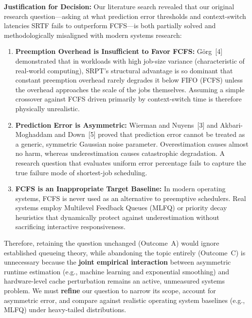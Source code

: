 \documentclass[11pt]{article}
\newcommand{\topicTitle}[1]{
    \vspace{1.2em}\noindent{\fontsize{14}{16.8}\selectfont \textbf{#1}}\par\vspace{0.5em}
}
\begin{document}
\noindent\textbf{Justification for Decision:}
Our literature search revealed that our original research question—asking at what prediction error thresholds and context-switch latencies SRTF fails to outperform FCFS—is both partially solved and methodologically misaligned with modern systems research:
\begin{enumerate}[label=(\alph*)]
    \item \textbf{Preemption Overhead is Insufficient to Favor FCFS:} G{\"o}rg~[4] demonstrated that in workloads with high job-size variance (characteristic of real-world computing), SRPT's structural advantage is so dominant that constant preemption overhead rarely degrades it below FIFO (FCFS) unless the overhead approaches the scale of the jobs themselves. Assuming a simple crossover against FCFS driven primarily by context-switch time is therefore physically unrealistic.
    \item \textbf{Prediction Error is Asymmetric:} Wierman and Nuyens~[3] and Akbari-Moghaddam and Down~[5] proved that prediction error cannot be treated as a generic, symmetric Gaussian noise parameter. Overestimation causes almost no harm, whereas underestimation causes catastrophic degradation. A research question that evaluates uniform error percentage fails to capture the true failure mode of shortest-job scheduling.
    \item \textbf{FCFS is an Inappropriate Target Baseline:} In modern operating systems, FCFS is never used as an alternative to preemptive schedulers. Real systems employ Multilevel Feedback Queues (MLFQ) or priority decay heuristics that dynamically protect against underestimation without sacrificing interactive responsiveness.
\end{enumerate}
Therefore, retaining the question unchanged (Outcome~A) would ignore established queueing theory, while abandoning the topic entirely (Outcome~C) is unnecessary because the \textbf{joint empirical interaction} between asymmetric runtime estimation (e.g., machine learning and exponential smoothing) and hardware-level cache perturbation remains an active, unmeasured systems problem. We must \textbf{refine} our question to narrow its scope, account for asymmetric error, and compare against realistic operating system baselines (e.g., MLFQ) under heavy-tailed distributions.

\vspace{1.0em}
\topicTitle{I. Revised Research Justification}
\end{document}
